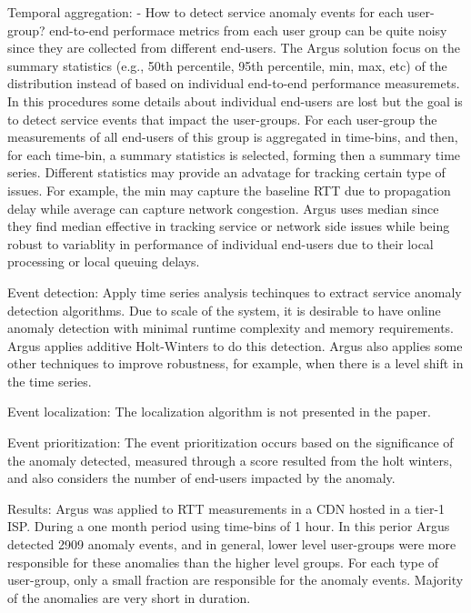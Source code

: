 Temporal aggregation:
- How to detect service anomaly events for each user-group? end-to-end
performace metrics from each user group can be quite noisy since they are
collected from different end-users. The Argus solution focus on the summary
statistics (e.g., 50th percentile, 95th percentile, min, max, etc) of the
distribution instead of based on individual end-to-end performance
measuremets. In this procedures some details about individual end-users are lost
but the goal is to detect service events that impact the user-groups.
For each user-group the measurements of all end-users of this group is
aggregated in time-bins, and then, for each time-bin, a summary statistics is
selected, forming then a summary time series. Different statistics may provide
an advatage for tracking certain type of issues. For example, the min may
capture the baseline RTT due to propagation delay while average can capture
network congestion. Argus uses median since they find median effective in
tracking service or network side issues while being robust to variablity in
performance of individual end-users due to their local processing or local
queuing delays.

Event detection:
Apply time series analysis techinques to extract service anomaly detection
algorithms. Due to scale of the system, it is desirable to have online
anomaly detection with minimal runtime complexity and memory requirements.
Argus applies additive Holt-Winters to do this detection. Argus also applies
some other techniques to improve robustness, for example, when there is a level
shift in the time series.

Event localization:
The localization algorithm is not presented in the paper.

Event prioritization:
The event prioritization occurs based on the significance of the anomaly
detected, measured through a score resulted from the holt winters, and also
considers the number of end-users impacted by the anomaly.

Results:
Argus was applied to RTT measurements in a CDN hosted in a tier-1 ISP. During a
one month period using time-bins of 1 hour. In this perior Argus detected 2909
anomaly events, and in general, lower level user-groups were more responsible
for these anomalies than the higher level groups. For each type of user-group,
only a small fraction are responsible for the anomaly events. Majority of the
anomalies are very short in duration.


